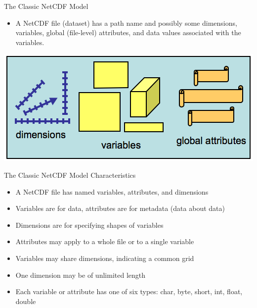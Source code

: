 \documentclass[compress,11pt,xcolor=svgnames,aspectratio=169]{beamer}
\begin{document}
\begin{frame}[t]{The Classic NetCDF Model}

\begin{itemize}

\item A NetCDF file (dataset) has a path name and possibly some dimensions, variables, global (file-level) attributes, and data values associated with the variables.

\end{itemize}

\begin{center}
\includegraphics[scale=0.6]{fig/netcdf-classic}
\end{center}

\end{frame}

\begin{frame}[t]{The Classic NetCDF Model Characteristics}

    \begin{itemize}
    \setlength\itemsep{0.4cm}
        \item A NetCDF file has named variables, attributes, and dimensions
        \item Variables are for data, attributes are for metadata (data about data)
        \item Dimensions are for specifying shapes of variables
        \item Attributes may apply to a whole file or to a single variable
        \item Variables may share dimensions, indicating a common grid
        \item One dimension may be of unlimited length
        \item Each variable or attribute has one of six types: char, byte, short, int, float, double
    \end{itemize}

\end{frame}
\end{document}
